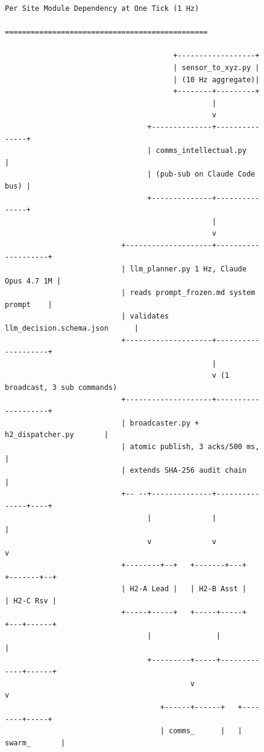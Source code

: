 \begin{sectionaccent}
\begin{figure}[H]
\vspace{-0.15cm}
\centering
\begin{Verbatim}[fontsize=\footnotesize]
                          Per Site Module Dependency at One Tick (1 Hz)
                         ===============================================
                            
                                       +------------------+
                                       | sensor_to_xyz.py |
                                       | (10 Hz aggregate)|
                                       +--------+---------+
                                                |
                                                v
                                 +--------------+---------------+
                                 | comms_intellectual.py        |
                                 | (pub-sub on Claude Code bus) |
                                 +--------------+---------------+
                                                |
                                                v
                           +--------------------+--------------------+
                           | llm_planner.py 1 Hz, Claude Opus 4.7 1M |
                           | reads prompt_frozen.md system prompt    |
                           | validates llm_decision.schema.json      |
                           +--------------------+--------------------+
                                                |
                                                v (1 broadcast, 3 sub commands)
                           +--------------------+--------------------+
                           | broadcaster.py + h2_dispatcher.py       |
                           | atomic publish, 3 acks/500 ms,          |
                           | extends SHA-256 audit chain             |
                           +-- --+--------------+---------------+----+
                                 |              |               |
                                 v              v               v
                           +--------+--+   +-------+---+   +-------+--+
                           | H2-A Lead |   | H2-B Asst |   | H2-C Rsv |
                           +-----+-----+   +-----+-----+   +---+------+
                                 |               |             |
                                 +---------+-----+-------------+------+
                                           v                   v
                                    +------+------+   +--------+-----+
                                    | comms_      |   | swarm_       |

\end{Verbatim}
\end{figure}
\end{sectionaccent}
